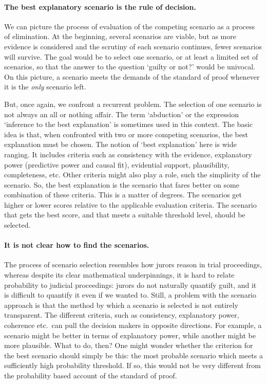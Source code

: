 \documentclass[10pt]{article}
\begin{document}
\paragraph{The best explanatory scenario is the rule of decision.}

We can picture the process of evaluation of the competing scenario as a process of elimination. 
At the beginning, several scenarios are viable, but as more evidence is considered and the scrutiny of each scenario continues,
fewer scenarios will survive. The goal would be to select one scenario, or at least a limited set of scenarios, so that 
the answer to the question `guilty or not?' would be univocal. On this picture, a scenario meets the demands of the standard 
of proof whenever it is the \textit{only} scenario left.

But, once again, we confront a recurrent problem. The selection of one scenario is not always an all or nothing affair.
The term `abduction' or the expression `inference to the best explanation' is sometimes used in this context. The basic idea is that, when confronted 
with two or more competing scenarios, the best explanation must be chosen. The notion of `best explanation' here is wide ranging. It includes criteria such as 
consistency with the evidence, explanatory power (predictive power and causal fit), evidential support, plausibility, completeness, etc. 
Other criteria might also play a role, such the simplicity of the scenario.  So, the best explanation is the scenario that fares 
better on some combination of these criteria. This is a matter of degrees. The scenarios get higher 
or lower scores relative to the applicable evaluation criteria. The scenario that gets the best score, and that 
meets a suitable threshold level, should be selected. 





\paragraph{It is not clear how to find the scenarios.}

The process of scenario selection resembles how jurors reason in trial proceedings, whereas despite its 
clear mathematical underpinnings, it is hard to relate probability to judicial proceedings: jurors do not 
naturally quantify guilt, and it is difficult to quantify it even if we wanted to. Still, a problem with the scenario approach is that 
the method by which a scenario is selected is not entirely transparent. The different criteria, such as consistency, explanatory power, coherence etc.\ 
can pull the decision makers in opposite directions. For example, a scenario might be better in terms of explanatory power, while another might 
be more plausible. What to do, then? One might wonder whether the criterion for the best scenario should simply be this:
the most probable scenario which meets a sufficiently high probability threshold. If so, this would not be very 
different from the probability based account of the standard of proof. 
\end{document}
